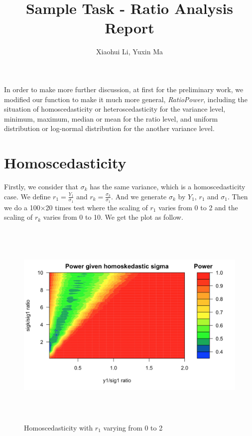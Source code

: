 \documentclass[10pt,english]{article}\usepackage{graphicx, color}
\numberwithin{equation}{section}
\numberwithin{figure}{section}
\begin{document}
\title{Sample Task - Ratio Analysis\\
Report}


\author{Xiaohui Li, Yuxin Ma}

\maketitle


In order to make more further discussion, at first for the preliminary work, we modified our function to make it much more general, \emph{RatioPower}, including the situation of homoscedasticity or heteroscedasticity for the variance level, minimum, maximum, median or mean for the ratio level, and uniform distribution or log-normal distribution for the another variance level.

\section{Homoscedasticity}

Firstly, we consider that $\sigma_k$ has the same variance, which is a homoscedasticity case. We define $r_1=\frac{Y_1}{\sigma_1}$ and $r_k=\frac{\sigma_k}{\sigma_1}$. And we generate $\sigma_k$ by $Y_1$, $r_1$ and $\sigma_1$. Then we do a 100$\times$20 times test where the scaling of $r_1$ varies from 0 to 2 and the scaling of $r_k$ varies from 0 to 10. We get the plot as follow.
\begin{figure}[htbp]
\centering\includegraphics[width=6.5in,height=4in]{homo}
\caption{Homoscedasticity with $r_1$ varying from 0 to 2}
\end{figure}
\end{document}
